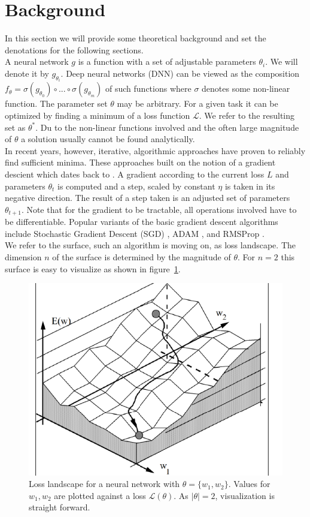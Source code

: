 \documentclass[a4paper]{scrartcl}
\begin{document}
\section*{Background}
In this section we will provide some theoretical background and set the denotations for the following sections.\\
A neural network $g$ is a function with a set of adjustable parameters $\theta_i$. We will denote it by $g_{\theta_i}$. Deep neural networks (DNN) can be viewed as the composition $f_{\theta} = \sigma (g_{\theta_0}) \circ ... \circ \sigma(g_{\theta_m})$ of such functions where $\sigma$ denotes some non-linear function. The parameter set $\theta$ may be arbitrary. For a given task it can be optimized by finding a minimum of a loss function $\mathcal{L}$. We refer to the resulting set as $\theta^*$. Du to the non-linear functions involved and the often large magnitude of $\theta$ a solution usually cannot be found analytically.\\
In recent years, however, iterative, algorithmic approaches have proven to reliably find sufficient minima. These approaches built on the notion of a gradient descient which dates back to \citet{cauchy1847methode}. A gradient according to the current loss $L$ and parameters $\theta_t$ is computed and a step, scaled by constant $\eta$ is taken in its negative direction. The result of a step taken is an adjusted set of parameters $\theta_{t+1}$. Note that for the gradient to be tractable, all operations involved have to be differentiable. Popular variants of the basic gradient descent algorithms include Stochastic Gradient Descent (SGD) \cite{robbins1951stochastic}, ADAM \cite{kingma2014adam}, and RMSProp \cite{graves2013generating}.\\
We refer to the surface, such an algorithm is moving on, as loss landscape. The dimension $n$ of the surface is determined by the magnitude of $\theta$. For $n=2$ this surface is easy to visualize as shown in figure~\ref{fig:twoweights}.


\begin{figure}
	\centering
	\includegraphics[width=.5\linewidth]{figures/two_weight_loss.png}
	\caption{Loss landscape for a neural network with $\theta = \lbrace w_1, w_2 \rbrace$. Values for $w_1, w_2$ are plotted against a loss $\mathcal{L}(\theta)$. As $|\theta| = 2$, visualization is straight forward.}
	\label{fig:twoweights}
\end{figure}
\end{document}
